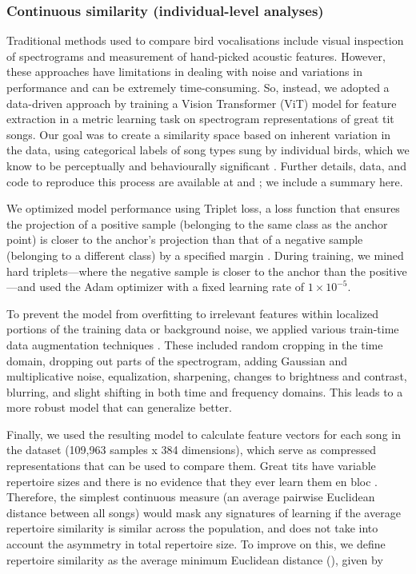 \documentclass[9pt, onecolumn, twoside, lineno]{gsajnl}
\begin{document}
\subsubsection{Continuous similarity (individual-level analyses)}
\label{sc:song-similarity}

Traditional methods used to compare bird vocalisations include visual inspection of spectrograms and measurement of hand-picked acoustic features. However, these approaches have limitations in dealing with noise and variations in performance and can be extremely time-consuming. So, instead, we adopted a data-driven approach by training a Vision Transformer (ViT) model for feature extraction in a metric learning task on spectrogram representations of great tit songs. Our goal was to create a similarity space based on inherent variation in the data, using categorical labels of song types sung by individual birds, which we know to be perceptually and behaviourally significant \autocite{lind1996}. Further details, data, and code to reproduce this process are available at \autocite{merinorecalde2023} and \autocite{merinorecalde2023a}; we include a summary here.

We optimized model performance using Triplet loss, a loss function that ensures the projection of a positive sample (belonging to the same class as the anchor point) is closer to the anchor's projection than that of a negative sample (belonging to a different class) by a specified margin \autocite{hermans2017, hoffer2018}. During training, we mined hard triplets---where the negative sample is closer to the anchor than the positive---and used the Adam optimizer with a fixed learning rate of $1 \times 10^{-5}$.

To prevent the model from overfitting to irrelevant features within localized portions of the training data or background noise, we applied various train-time data augmentation techniques \autocite{mumuni2022,perez2017,shorten2019}. These included random cropping in the time domain, dropping out parts of the spectrogram, adding Gaussian and multiplicative noise, equalization, sharpening, changes to brightness and contrast, blurring, and slight shifting in both time and frequency domains. This leads to a more robust model that can generalize better.

Finally, we used the resulting model to calculate feature vectors for each song in the dataset (109,963 samples x 384 dimensions), which serve as compressed representations that can be used to compare them. Great tits have variable repertoire sizes and there is no evidence that they ever learn them en bloc \autocite{mcgregor1982b, rivera-gutierrez2010a}. Therefore, the simplest continuous measure (an average pairwise Euclidean distance between all songs) would mask any signatures of learning if the average repertoire similarity is similar across the population, and does not take into account the asymmetry in total repertoire size. To improve on this, we define repertoire similarity as the average minimum Euclidean distance (), given by
\end{document}
